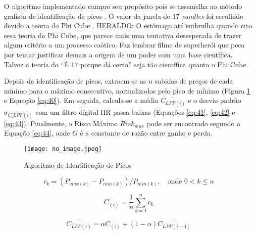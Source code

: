 \begin{itemize}
    O algoritmo implementado cumpre seu propósito pois se assemelha ao método grafista de identificação de picos \cite{moraes2007se}. O valor da janela de 17 \textit{candles} foi escolhido devido a teoria do Phi Cube \cite{moraes2007se}. \color{red} HERALDO: O estômago até embrulha quando cito essa teoria do Phi Cube, que parece mais uma tentativa desesperada de trazer algum critério a um processo caótico. Faz lembrar filme de superherói que peca por tentar justificar demais a origem de um poder com uma base científica. Talvez a teoria do ``É 17 porque dá certo'' seja tão científica quanto o Phi Cube. 

    Depois da identificação de picos, extraem-se as \begin{math} n \end{math} subidas de preços de cada mínimo para o máximo consecutivo, normalizados pelo pico de mínimo (Figura \ref{fig:107} e Equação \ref{eq:40}). Em seguida, calcula-se a média \begin{math} \overline{C_{LPF(i)}} \end{math} e o desvio padrão \begin{math} \sigma_{C\_LPF(i)} \end{math} com um filtro digital IIR passa-baixas (Equações \ref{eq:41}, \ref{eq:42} e \ref{eq:43}). Finalmente, o Risco Máximo \begin{math} Risk_{max} \end{math} pode ser encontrado segundo a Equação \ref{eq:44}, onde \begin{math} G \end{math} é a constante de razão entre ganho e perda.

    \begin{figure}[h]
        \texttt{[image: no\_image.jpeg]}
        \centering
        \caption{Algoritmo de Identificação de Picos}
        \label{fig:107}
    \end{figure}

    \begin{equation} \label{eq:40}
        c_k = (P_{max(k)} - P_{min(k)}) / P_{min(k)}, \quad \textrm{onde } 0 < k \le n
    \end{equation}

    \begin{equation} \label{eq:41}
        \overline{C_{(i)}} = \dfrac{1}{n} \sum_{k=1}^{n} c_k
    \end{equation}

    \begin{equation} \label{eq:42}
        \overline{C_{LPF(i)}} = \alpha \overline{C_{(i)}} + (1 - \alpha) \overline{C_{LPF(i-1)}}
    \end{equation}


\end{itemize}
